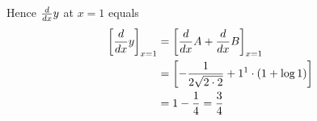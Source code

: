 \documentclass[14pt,fleqn]{extarticle}
\begin{document}
\begin{problem}
\begin{step}
Hence $\frac{d}{dx} y$ at $x = 1$ equals 
\begin{align}
\left[\frac{d}{dx} y \right]_{x=1} &= \left[\frac{d}{dx} A + \frac{d}{dx} B \right]_{x=1} \\ 
&= \left[- \frac{1}{2\sqrt{2\cdot 2}} + 1^1\cdot \left(1 + \log 1 \right)  \right] \\
&= 1 - \frac{1}{4} = \frac{3}{4}
\end{align}
\end{step}
\end{problem} 
\end{document}
